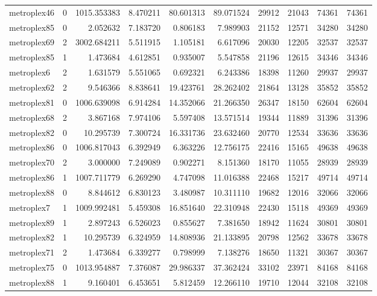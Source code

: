 \begin{longtable}{|l|r|r|r|r|r|r|r|r|r|}
metroplex46 & 0 & 1015.353383 & 8.470211 & 80.601313 & 89.071524 & 29912 & 21043 & 74361 & 74361 \\
metroplex85 & 0 & 2.052632 & 7.183720 & 0.806183 & 7.989903 & 21152 & 12571 & 34280 & 34280 \\
metroplex69 & 2 & 3002.684211 & 5.511915 & 1.105181 & 6.617096 & 20030 & 12205 & 32537 & 32537 \\
metroplex85 & 1 & 1.473684 & 4.612851 & 0.935007 & 5.547858 & 21196 & 12615 & 34346 & 34346 \\
metroplex6 & 2 & 1.631579 & 5.551065 & 0.692321 & 6.243386 & 18398 & 11260 & 29937 & 29937 \\
metroplex62 & 2 & 9.546366 & 8.838641 & 19.423761 & 28.262402 & 21864 & 13128 & 35852 & 35852 \\
metroplex81 & 0 & 1006.639098 & 6.914284 & 14.352066 & 21.266350 & 26347 & 18150 & 62604 & 62604 \\
metroplex68 & 2 & 3.867168 & 7.974106 & 5.597408 & 13.571514 & 19344 & 11889 & 31396 & 31396 \\
metroplex82 & 0 & 10.295739 & 7.300724 & 16.331736 & 23.632460 & 20770 & 12534 & 33636 & 33636 \\
metroplex86 & 0 & 1006.817043 & 6.392949 & 6.363226 & 12.756175 & 22416 & 15165 & 49638 & 49638 \\
metroplex70 & 2 & 3.000000 & 7.249089 & 0.902271 & 8.151360 & 18170 & 11055 & 28939 & 28939 \\
metroplex86 & 1 & 1007.711779 & 6.269290 & 4.747098 & 11.016388 & 22468 & 15217 & 49714 & 49714 \\
metroplex88 & 0 & 8.844612 & 6.830123 & 3.480987 & 10.311110 & 19682 & 12016 & 32066 & 32066 \\
metroplex7 & 1 & 1009.992481 & 5.459308 & 16.851640 & 22.310948 & 22430 & 15118 & 49369 & 49369 \\
metroplex89 & 1 & 2.897243 & 6.526023 & 0.855627 & 7.381650 & 18942 & 11624 & 30801 & 30801 \\
metroplex82 & 1 & 10.295739 & 6.324959 & 14.808936 & 21.133895 & 20798 & 12562 & 33678 & 33678 \\
metroplex71 & 2 & 1.473684 & 6.339277 & 0.798999 & 7.138276 & 18650 & 11321 & 30367 & 30367 \\
metroplex75 & 0 & 1013.954887 & 7.376087 & 29.986337 & 37.362424 & 33102 & 23971 & 84168 & 84168 \\
metroplex88 & 1 & 9.160401 & 6.453651 & 5.812459 & 12.266110 & 19710 & 12044 & 32108 & 32108 \\

\end{longtable}
